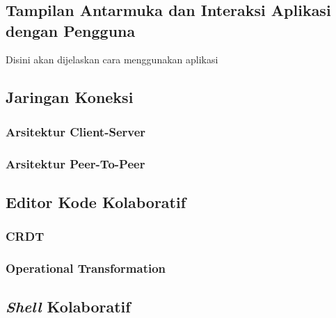 \chapter{\babEmpat}
\label{bab:4}

\section{Tampilan Antarmuka dan Interaksi Aplikasi dengan Pengguna}

Disini akan dijelaskan cara menggunakan aplikasi

\section{Jaringan Koneksi}

\subsection{Arsitektur Client-Server}

\subsection{Arsitektur Peer-To-Peer}

\section{Editor Kode Kolaboratif}

\subsection{CRDT}

\subsection{Operational Transformation}

\section{\textit{Shell} Kolaboratif}

